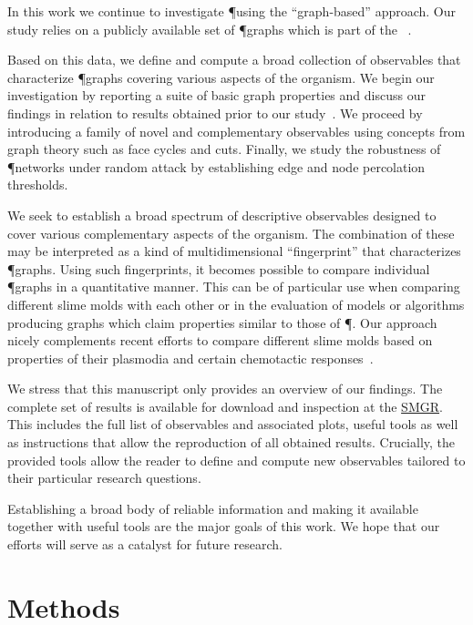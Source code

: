 	In this work we continue to investigate \P using the ``graph-based'' approach. Our study relies on a publicly available set of \P graphs which is part of the \SMGR~\cite{SMGR}.

	Based on this data, we define and compute a broad collection of observables that characterize \P graphs covering various aspects of the organism. We begin our investigation by reporting a suite of basic graph properties and discuss our findings in relation to results obtained prior to our study~\cite{baumgarten2010plasmodial}. We proceed by introducing a family of novel and complementary observables using concepts from graph theory such as face cycles and cuts. Finally, we study the robustness of \P networks under random attack by establishing edge and node percolation thresholds. 

	We seek to establish a broad spectrum of descriptive observables designed to cover various complementary aspects of the organism. The combination of these may be interpreted as a kind of multidimensional ``fingerprint'' that characterizes \P graphs. Using such fingerprints, it becomes possible to compare individual \P graphs in a quantitative manner. This can be of particular use when comparing different slime molds with each other or in the evaluation of models or algorithms producing graphs which claim properties similar to those of \P. Our approach nicely complements recent efforts to compare different slime molds based on properties of their plasmodia and certain chemotactic responses~\cite{westendorf2016quantitative}.

	We stress that this manuscript only provides an overview of our findings. The complete set of results is available for download and inspection at the \href{http://smgr.mpi-inf.mpg.de}{SMGR}. This includes the full list of observables and associated plots, useful tools as well as instructions that allow the reproduction of all obtained results. Crucially, the provided tools allow the reader to define and compute new observables tailored to their particular research questions.

	Establishing a broad body of reliable information and making it available together with useful tools are the major goals of this work. We hope that our efforts will serve as a catalyst for future research.

\section{Methods}

